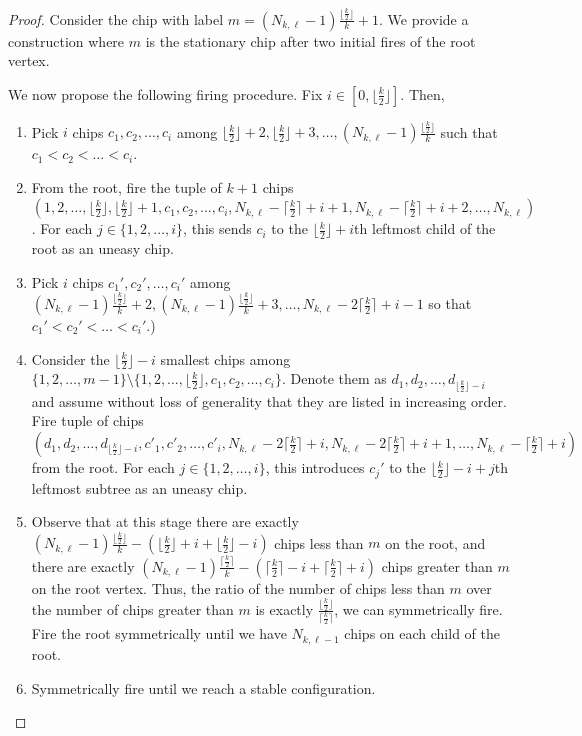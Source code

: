 \documentclass[11pt]{article}
\theoremstyle{remark}
\theoremstyle{definition}
\begin{document}
\begin{proof}

Consider the chip with label $m = (N_{k, \ell}-1)\frac{\lfloor \frac{k}{2} \rfloor}{k}+1$. We provide a construction where $m$ is the stationary chip after two initial fires of the root vertex.

We now propose the following firing procedure. Fix $i \in [0, \lfloor \frac k 2 \rfloor ]$. Then,
\begin{enumerate}
    \item Pick $i$ chips $c_1, c_2, \dots, c_i$ among $\lfloor \frac{k}{2} \rfloor+2, \lfloor \frac{k}{2} \rfloor+3, \dots, (N_{k, \ell}-1)\frac{\lfloor \frac{k}{2} \rfloor}{k}$ such that $c_1 < c_2 < \dots < c_i$.
    \item From the root, fire the tuple of $k+1$ chips $(1, 2, \dots, \lfloor \frac{k}{2} \rfloor,\lfloor \frac{k}{2} \rfloor+1, c_1, c_2, \dots, c_i, N_{k, \ell} -\lceil \frac{k}{2} \rceil +i +1, N_{k, \ell} -\lceil \frac{k}{2} \rceil +i +2,  \dots, N_{k, \ell})$. For each $j \in \{1, 2, \dots, i\}$, this sends $c_i$ to the $\lfloor \frac{k}{2} \rfloor+i$th leftmost child of the root as an uneasy chip.
    \item Pick $i$ chips $c_1', c_2', \dots, c_i'$ among $(N_{k, \ell}-1)\frac{\lfloor \frac{k}{2} \rfloor}{k}+2, (N_{k, \ell}-1)\frac{\lfloor \frac{k}{2} \rfloor}{k}+3, \dots, N_{k, \ell} - 2\lceil\frac{k}{2} \rceil+i-1$ so that $c_1' < c_2' < \dots < c_i'$.) 
    \item Consider the $\lfloor\frac{k}{2} \rfloor -i$ smallest chips among $\{1, 2, \dots, m-1\} \setminus \{1,2, \dots, \lfloor  \frac{k}{2}\rfloor, c_1, c_2, \dots, c_i\}$. Denote them as $d_1, d_2, \dots, d_{\lfloor\frac{k}{2} \rfloor -i}$ and assume without loss of generality that they are listed in increasing order. Fire tuple of chips $(d_1, d_2, \dots, d_{\lfloor \frac{k}{2} \rfloor - i}, c'_1, c'_2, \dots, c'_i, N_{k, \ell} - 2\lceil \frac{k}{2} \rceil+i, N_{k, \ell} - 2\lceil \frac{k}{2} \rceil +i+1, \dots, N_{k, \ell} - \lceil \frac{k}{2} \rceil+i)$ from the root. For each $j \in \{1, 2, \dots, i\}$, this introduces $c_j'$ to the $\lfloor \frac{k}{2} \rfloor - i + j$th leftmost subtree as an uneasy chip.
    \item  Observe that at this stage there are exactly $(N_{k, \ell}-1)\frac{\lfloor \frac{k}{2} \rfloor}{k} - (\lfloor \frac{k}{2} \rfloor+i +\lfloor \frac{k}{2}\rfloor - i)$ chips less than $m$ on the root, and there are exactly $(N_{k, \ell}-1)\frac{\lceil \frac{k}{2} \rceil}{k} - (\lceil \frac{k}{2} \rceil-i +\lceil \frac{k}{2}\rceil + i)$ chips greater than $m$ on the root vertex. Thus, the ratio of the number of chips less than $m$ over the number of chips greater than $m$ is exactly $\frac{\lfloor \frac{k}{2} \rfloor}{\lceil \frac{k}{2} \rceil}$, we can symmetrically fire. Fire the root symmetrically until we have $N_{k, \ell-1}$ chips on each child of the root. 
    \item Symmetrically fire until we reach a stable configuration. 
\end{enumerate}


\end{proof}
\end{document}
